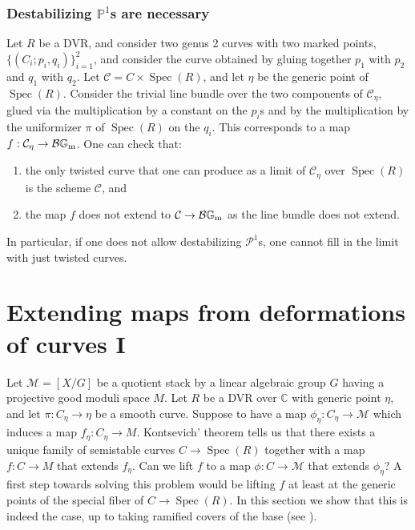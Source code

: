 \documentclass{amsart}
\newcommand{\bG}{\mathbb{G}}
\newcommand{\bP}{\mathbb{P}}
\newcommand{\cB}{\mathcal{B}}
\newcommand{\cC}{\mathcal{C}}
\newcommand{\cM}{\mathcal{M}}
\newcommand{\cP}{\mathcal{P}}
\newcommand{\qB}{R}
\newcommand{\spec}{\operatorname{Spec}}
\newcommand{\Gm}{\bG_{{\rm m}}}
\theoremstyle{definition}
\begin{document}
\subsubsection{Destabilizing $\bP^1$s are necessary}\label{subsubsection P1s are necessary} Let $R$ be a DVR, and consider two genus 2 curves with two marked points, $\{(C_i;p_i,q_i)\}_{i=1}^2$, and consider the curve obtained by gluing together $p_1$ with $p_2$ and $q_1$ with $q_2$. Let $\cC=C\times\spec(R)$, and let $\eta$ be the generic point of $\spec(R)$. 
Consider the trivial line bundle over the two components of $\cC_\eta$, glued via the multiplication by a constant on the $p_i$s and by the multiplication by the uniformizer $\pi$ of $\spec(R)$ on the $q_i$.
This corresponds to a map $f:\cC_\eta \to \cB\Gm$. One can check that:
\begin{enumerate}
    \item the only twisted curve that one can produce as a limit of $\cC_\eta$ over $\spec(R)$ is the scheme $\cC$, and
    \item the map $f$ does not extend to $\cC\to \cB\Gm$ as the line bundle does not extend.
\end{enumerate}
In particular, if one does not allow destabilizing $\cP^1$s, one cannot fill in the limit with just twisted curves.

\section{Extending maps from deformations of curves I}\label{sec:fix}
Let $\cM=[X/G]$ be a quotient stack by a linear algebraic group $G$ having a projective good moduli space $M$. Let  $\qB$ be a DVR over $\mathbb{C}$ with generic point $\eta$, and let $\pi:C_\eta\to \eta$ be a smooth curve. Suppose to have a map $\phi_\eta:C_\eta\to \cM$ which induces a map $f_\eta:C_\eta\to M$. Kontsevich' theorem tells us that there exists a unique family of semistable curves $C\to \spec(\qB)$ together with a map $f:C\to M$  that extends $f_\eta$. Can we lift $f$ to a map $\phi:C\to \cM$ that extends $\phi_\eta$? A first step towards solving this problem would be lifting $f$ {at least at the generic points of the special fiber of }$C\to \spec(\qB)$. In this section we show that this is indeed the case, up to taking ramified covers of the base (see ).
\end{document}
